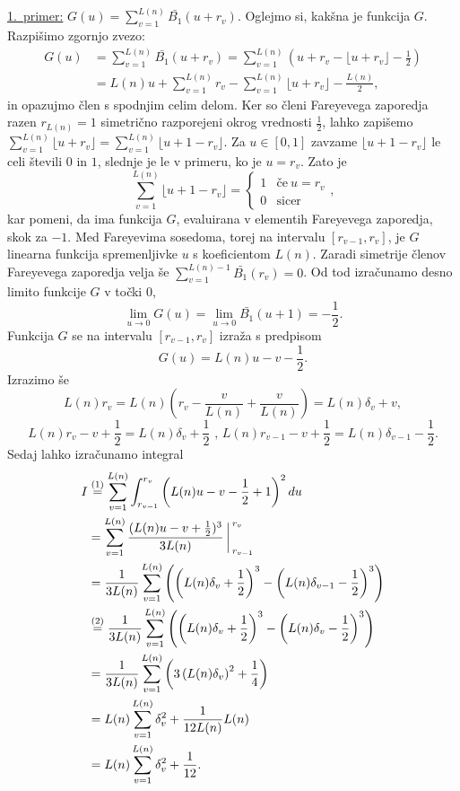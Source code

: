 \documentclass[mat1]{fmfdelo}
\begin{document}
\underline{1.~primer:} $G(u) = \sum_{v=1}^{L(n)} \bar{B_{1}}(u+r_v)$.
Oglejmo si, kakšna je funkcija $G$. Razpišimo zgornjo zvezo:
\begin{align}
G(u) &= \sum_{v=1}^{L(n)} \bar{B_{1}}(u+r_v) = \sum_{v=1}^{L(n)} \left(u+r_v - \lfloor u+r_v \rfloor - \frac{1}{2} \right) \nonumber \\
       &= L(n)u + \sum_{v=1}^{L(n)}r_v - \sum_{v=1}^{L(n)} \lfloor u+r_v \rfloor - \frac{L(n)}{2},
\end{align}
in opazujmo člen s spodnjim celim delom. Ker so členi Fareyevega zaporedja razen $r_{L(n)}=1$ simetrično razporejeni okrog vrednosti $\frac{1}{2}$, lahko zapišemo $\sum_{v=1}^{L(n)} \lfloor u+r_v \rfloor = \sum_{v=1}^{L(n)} \lfloor u+1-r_v \rfloor$. Za $u\in[0,1]$ zavzame $\lfloor u+1-r_v \rfloor$ le celi števili $0$ in $1$, slednje je le v primeru, ko je $u=r_{v}$. Zato je 
\[
\sum_{v=1}^{L(n)} \lfloor u+1-r_v \rfloor = \left\{
\begin{array}{rl}
	1 & \textrm{če}\ u = r_{v}\\
	0 & \textrm{sicer}
\end{array},
\right.
\]
kar pomeni, da ima funkcija $G$, evaluirana v elementih Fareyevega zaporedja, skok za $-1$. Med Fareyevima sosedoma, torej na intervalu $[r_{v-1},r_{v}]$, je $G$ linearna funkcija spremenljivke $u$ s koeficientom $L(n)$.
Zaradi simetrije členov Fareyevega zaporedja velja še $\sum_{v=1}^{L(n)-1} \bar{B_{1}}(r_v) = 0$. Od tod izračunamo desno limito funkcije $G$ v točki $0$,
\[ \lim_{u \to 0} G(u) = \lim_{u \to 0} \bar{B_{1}}(u+1) = -\frac{1}{2}. \]
Funkcija $G$ se na intervalu $[r_{v-1},r_{v}]$ izraža s predpisom
\[ G(u) = L(n)u - v - \frac{1}{2}. \]
%
Izrazimo še 
\[ L(n)r_{v} = L(n) \left( r_{v}-\frac{v}{L(n)}+\frac{v}{L(n)} \right) = L(n) \delta_{v} + v, \]
\[ L(n)r_{v}-v+\frac{1}{2} = L(n) \delta_{v} + \frac{1}{2} \textrm{ , } L(n)r_{v-1}-v+\frac{1}{2} = L(n) \delta_{v-1} - \frac{1}{2}. \]
%
Sedaj lahko izračunamo integral 
\begin{align}
\label{Eq:I1}
I &\stackrel{(1)}{=} \sum_{v=1}^{L(n)} \int_{r_{v-1}}^{r_{v}} \left( L(n)u-v-\frac{1}{2}+1 \right)^2 du \nonumber \\
  &= \sum_{v=1}^{L(n)} \frac{(L(n)u-v+\frac{1}{2})^3}{3L(n)} \bigg \arrowvert_{r_{v-1}}^{r_{v}} \nonumber \\
  &= \frac{1}{3L(n)} \sum_{v=1}^{L(n)} \left( \left(L(n) \delta_{v} + \frac{1}{2} \right)^3 - \left(L(n) \delta_{v-1} - \frac{1}{2} \right)^3 \right) \nonumber \\
  &\stackrel{(2)}{=} \frac{1}{3L(n)} \sum_{v=1}^{L(n)} \left( \left(L(n) \delta_{v} + \frac{1}{2} \right)^3 - \left(L(n) \delta_{v} - \frac{1}{2} \right)^3 \right) \nonumber \\
  &= \frac{1}{3L(n)} \sum_{v=1}^{L(n)} \left(3 \left(L(n) \delta_{v} \right)^2 + \frac{1}{4} \right) \nonumber \\
  &= L(n) \sum_{v=1}^{L(n)} \delta_{v}^2 + \frac{1}{12L(n)} L(n) \nonumber \\
  &= L(n) \sum_{v=1}^{L(n)} \delta_{v}^2 + \frac{1}{12}.
\end{align}
\end{document}
